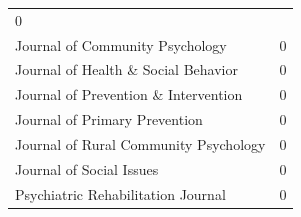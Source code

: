 \documentclass[]{tufte-handout}
\begin{document}
\begin{longtable}[]{@{}ll@{}}
\begin{minipage}[t]{0.21\columnwidth}
0\strut
\end{minipage}\tabularnewline
\begin{minipage}[t]{0.68\columnwidth}\raggedright\strut
Journal of Community Psychology\strut
\end{minipage} & \begin{minipage}[t]{0.21\columnwidth}\raggedright\strut
0\strut
\end{minipage}\tabularnewline
\begin{minipage}[t]{0.68\columnwidth}\raggedright\strut
Journal of Health \& Social Behavior\strut
\end{minipage} & \begin{minipage}[t]{0.21\columnwidth}\raggedright\strut
0\strut
\end{minipage}\tabularnewline
\begin{minipage}[t]{0.68\columnwidth}\raggedright\strut
Journal of Prevention \& Intervention\strut
\end{minipage} & \begin{minipage}[t]{0.21\columnwidth}\raggedright\strut
0\strut
\end{minipage}\tabularnewline
\begin{minipage}[t]{0.68\columnwidth}\raggedright\strut
Journal of Primary Prevention\strut
\end{minipage} & \begin{minipage}[t]{0.21\columnwidth}\raggedright\strut
0\strut
\end{minipage}\tabularnewline
\begin{minipage}[t]{0.68\columnwidth}\raggedright\strut
Journal of Rural Community Psychology\strut
\end{minipage} & \begin{minipage}[t]{0.21\columnwidth}\raggedright\strut
0\strut
\end{minipage}\tabularnewline
\begin{minipage}[t]{0.68\columnwidth}\raggedright\strut
Journal of Social Issues\strut
\end{minipage} & \begin{minipage}[t]{0.21\columnwidth}\raggedright\strut
0\strut
\end{minipage}\tabularnewline
\begin{minipage}[t]{0.68\columnwidth}\raggedright\strut
Psychiatric Rehabilitation Journal\strut
\end{minipage} & \begin{minipage}[t]{0.21\columnwidth}\raggedright\strut
0\strut
\end{minipage}\tabularnewline

\end{longtable}
\end{document}
